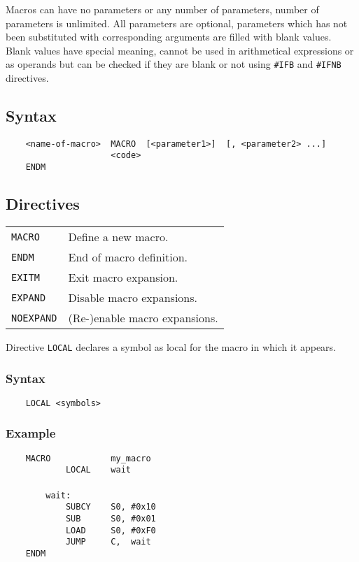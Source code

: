     Macros can have no parameters or any number of parameters, number of parameters is unlimited. All parameters are optional, parameters which has not been substituted with corresponding arguments are filled with blank values. Blank values have special meaning, cannot be used in arithmetical expressions or as operands but can be checked if they are blank or not using \texttt{\#IFB} and \texttt{\#IFNB} directives.

    \subsection{Syntax}
        \verb'    <name-of-macro>  MACRO  [<parameter1>]  [, <parameter2> ...]'\\
        \verb'                     <code>'\\
        \verb'    ENDM'

    \subsection{Directives}
        \begin{table}[h!]
            \begin{tabular}{ll}
                \texttt{MACRO}      & Define a new macro. \\
                \texttt{ENDM}       & End of macro definition. \\
                \texttt{EXITM}      & Exit macro expansion. \\
                \texttt{EXPAND}     & Disable macro expansions.\\
                \texttt{NOEXPAND}   & (Re-)enable macro expansions.\\
            \end{tabular}
        \end{table}

        Directive \texttt{LOCAL} declares a symbol as local for the macro in which it appears.

        \subsubsection{Syntax}
            \verb'    LOCAL <symbols>'

        \subsubsection{Example}
            \verb'    MACRO            my_macro'\\
            \verb'            LOCAL    wait'\\
            \verb''\\
            \verb'        wait:'\\
            \verb'            SUBCY    S0, #0x10'\\
            \verb'            SUB      S0, #0x01' \\
            \verb'            LOAD     S0, #0xF0'\\
            \verb'            JUMP     C,  wait'\\
            \verb'    ENDM'

